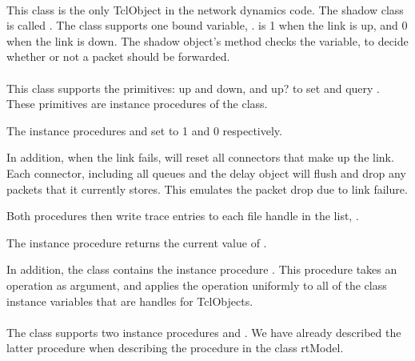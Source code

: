 \paragraph{}
This class is the only TclObject in the network dynamics code.
The shadow class is called .
The class supports one bound variable, .
 is 1 when the link is up, and 0 when the link is down.
The shadow object's 
method checks the  variable, to decide whether or not
a packet should be forwarded.

\paragraph{}
This class supports the primitives:
up and down, and up? to set and query .
These primitives are instance procedures of the class.
\begin{list}{}{}
\item  The instance procedures
   and
  set  to 1 and 0 respectively.

  In addition, when the link fails, 
  will reset all connectors that make up the link.
  Each connector, including all queues and the delay object
  will flush and drop any packets that it currently stores.
  This emulates the packet drop due to link failure.

  Both procedures then write trace entries to each file handle
  in the list, .

\item The instance procedure
  returns the current value of .
\end{list}
In addition, the class contains the instance procedure
.
This procedure takes an operation as argument, and applies
the operation uniformly to all of the class instance variables
that are handles for TclObjects.

\paragraph{}
The class supports two instance procedures
 and
.
We have already described the latter procedure when describing the
 procedure in the class rtModel.

